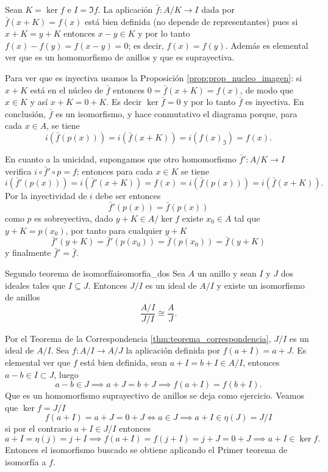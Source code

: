 \begin{proofbox}
Sean $K = \ker f$ e $I = \Im f$. La aplicación $\bar{f} : A/K \to I$ dada por $\bar{f}(x + K) = f(x)$ está bien definida (no depende de representantes) pues si $x + K = y + K$ entonces $x - y \in K$ y por lo tanto $f(x) - f(y) = f(x - y) = 0$; es decir, $f(x) = f(y)$. Además es elemental ver que es un homomorfismo de anillos y que es suprayectiva.

Para ver que es inyectiva usamos la Proposición \ref{prop:prop_nucleo_imagen}: si $x + K$ está en el núcleo de $\bar{f}$ entonces $0 = \bar{f}(x + K) = f(x)$, de modo que $x \in K$ y así $x + K = 0 + K$. Es decir $\ker \bar{f} = 0$ y por lo tanto $\bar{f}$ es inyectiva. En conclusión, $\bar{f}$ es un isomorfismo, y hace conmutativo el diagrama porque, para cada $x \in A$, se tiene
\[
i(\bar{f}(p(x))) = i(\bar{f}(x + K)) = i(f(x)_{\Im}) = f(x).
\]

En cuanto a la unicidad, supongamos que otro homomorfismo $\bar{f}' : A/K \to I$ verifica $i \circ \bar{f}' \circ p = f$; entonces para cada $x \in K$ se tiene 
\[
i(\bar{f}'(p(x))) = i(\bar{f}'(x + K)) = f(x) = i(\bar{f}(p(x))) = i(\bar{f}(x + K)).
\]
Por la inyectividad de $i$ debe ser entonces
\[
\bar{f}'(p(x)) = \bar{f}(p(x))
\]
como $p$ es sobreyectiva, dado $y + K \in A/\ker f$ existe $x_0 \in A$ tal que $y + K = p(x_0)$, por tanto para cualquier $y + K$
\[
\bar{f}'(y + K) = \bar{f}'(p(x_0)) = \bar{f}(p(x_0)) = \bar{f}(y + K)
\]
y finalmente $\bar{f}' = \bar{f}$.
\end{proofbox}

\begin{theorem}{Segundo teorema de isomorfía}{isomorfia_dos}
Sea $A$ un anillo y sean $I$ y $J$ dos ideales tales que $I \subseteq J$. Entonces $J/I$ es un ideal de $A/I$ y existe un isomorfismo de anillos
\[
\frac{A/I}{J/I} \cong \frac{A}{J}.
\]
\end{theorem}

\begin{proofbox}
Por el Teorema de la Correspondencia \ref{thm:teorema_correspondencia}, $J/I$ es un ideal de $A/I$. Sea $f : A/I \to A/J$ la aplicación definida por $f(a + I) = a + J$. Es elemental ver que $f$ está bien definida, sean $a + I = b + I \in A/I$, entonces $a-b \in I \subset J$, luego
\[
a - b \in J \implies a + J = b + J \implies f(a + I) = f(b + I).
\]
Que es un homomorfismo suprayectivo de anillos se deja como ejercicio. Veamos que $\ker f = J/I$
\[
f(a+I) = a + J = 0 + J \iff a \in J \implies a + I \in \eta(J) = J/I
\]
si por el contrario $a + I \in J/I$ entonces
\[
a + I = \eta(j) = j + I \implies f(a + I) = f(j + I) = j + J = 0 + J \implies a + I \in \ker f.
\]
Entonces el isomorfismo buscado se obtiene aplicando el Primer teorema de isomorfía a $f$.
\end{proofbox}


